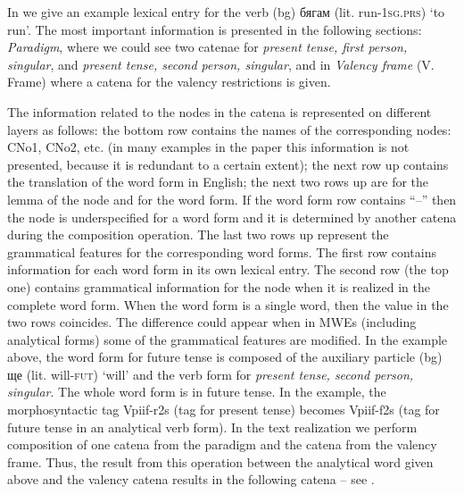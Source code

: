 \documentclass[output=paper,colorlinks,citecolor=brown]{langscibook}
\begin{document}
In  we give an example lexical entry for the verb 
(bg) {бягам }
(lit. run-\textsc{1sg.prs}) {`to run'}. The most important information is presented in the following sections: \emph{Paradigm}, where we could see two catenae for {\em present tense, first person, singular}, and  {\em present tense, second person, singular}, and in \emph{Valency frame} (V. Frame) where a catena for the valency restrictions is given.

The information related to the nodes in the catena is represented on different layers as follows: the bottom row contains the names of the corresponding nodes: CNo1, CNo2, etc. (in many examples in the paper this information is not presented, because it is redundant to a certain extent); the next row up contains the translation of the word form in English; the next two rows up are for the lemma of the node and for the word form. If the word form row contains ``--'' then the node is underspecified for a word form and it is determined by another catena during the composition operation. The last two rows up represent the grammatical features for the corresponding word forms. The first row contains information for each word form in its own lexical entry. The second row (the top one) contains grammatical information for the node when it is realized in the complete word form. When the word form is a single word, then the value in the two rows coincides. The difference could appear when in MWEs (including analytical forms) some of the grammatical features are modified. In the example above, the word form for future tense is composed of the auxiliary particle 
(bg) {ще }
(lit. will-\textsc{fut}) {`will'}
and the verb form for {\em present tense, second person, singular}. The whole word form is in future tense. In the example, the morphosyntactic tag Vpiif-r2s (tag for present tense) becomes Vpiif-f2s (tag for future tense in an analytical verb form). In the text realization we perform composition of one catena from the paradigm and the catena from the valency frame. Thus, the result from this operation between the analytical word given above and the valency catena results in the following catena -- see .
\end{document}
